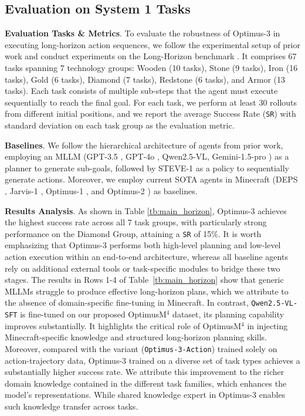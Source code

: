

\subsection{Evaluation on System 1 Tasks}
\noindent\textbf{Evaluation Tasks \& Metrics}. To evaluate the robustness of Optimus-3 in executing long-horizon action sequences, we follow the experimental setup of prior work and conduct experiments on the Long-Horizon benchmark \cite{li2024optimus}. It comprises 67 tasks spanning 7 technology groups: Wooden (10 tasks), Stone (9 tasks), Iron (16 tasks), Gold (6 tasks), Diamond (7 tasks), Redstone (6 tasks), and Armor (13 tasks). Each task consists of multiple sub-steps that the agent must execute sequentially to reach the final goal. For each task, we perform at least 30 rollouts from different initial positions, and we report the average Success Rate (\texttt{SR}) with standard deviation on each task group as the evaluation metric.

\noindent\textbf{Baselines}. We follow the hierarchical architecture of agents from prior work, employing an MLLM (GPT-3.5 \cite{gpt3}, GPT-4o \cite{gpt4}, Qwen2.5-VL\cite{bai2025qwen2}, Gemini-1.5-pro \cite{team2024gemini}) as a planner to generate sub-goals, followed by STEVE-1 as a policy to sequentially generate actions. Moreover, we employ current SOTA agents in Minecraft (DEPS \cite{wang2023describe}, Jarvis-1 \cite{wang2023jarvis}, Optimus-1 \cite{li2024optimus}, and Optimus-2 \cite{li2025optimus}) as baselines.



\noindent\textbf{Results Analysis}. As shown in Table \ref{tb:main_horizon}, Optimus-3 achieves the highest success rate across all 7 task groups, with particularly strong performance on the Diamond Group, attaining a \texttt{SR} of 15\%. It is worth emphasizing that Optimus-3 performs both high-level planning and low-level action execution within an end-to-end architecture, whereas all baseline agents \cite{wang2023describe,wang2023jarvis,li2024optimus,li2025optimus} rely on additional external tools or task-specific modules to bridge these two stages. The results in Rows 1-4 of Table~\ref{tb:main_horizon} show that generic MLLMs struggle to produce effective long-horizon plans, which we attribute to the absence of domain-specific fine-tuning in Minecraft. In contrast, \texttt{Qwen2.5-VL-SFT} is fine-tuned on our proposed OptimusM$^4$ dataset, its planning capability improves substantially. It highlights the critical role of OptimusM$^4$ in injecting Minecraft-specific knowledge and structured long-horizon planning skills. Moreover, compared with the variant (\texttt{Optimus-3-Action}) trained solely on action-trajectory data, Optimus-3 trained on a diverse set of task types achieves a substantially higher success rate. We attribute this improvement to the richer domain knowledge contained in the different task families, which enhances the model's representations. While shared knowledge expert in Optimus-3 enables such knowledge transfer across tasks.



